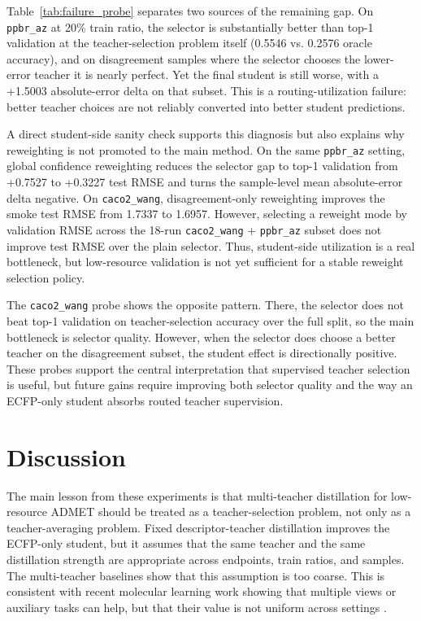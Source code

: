 \documentclass[11pt]{article}
\begin{document}
Table~\ref{tab:failure_probe} separates two sources of the remaining gap. On
\texttt{ppbr\_az} at 20\% train ratio, the selector is substantially better
than top-1 validation at the teacher-selection problem itself
(0.5546 vs. 0.2576 oracle accuracy), and on disagreement samples where the
selector chooses the lower-error teacher it is nearly perfect. Yet the final
student is still worse, with a +1.5003 absolute-error delta on that subset.
This is a routing-utilization failure: better teacher choices are not reliably
converted into better student predictions.

A direct student-side sanity check supports this diagnosis but also explains
why reweighting is not promoted to the main method. On the same
\texttt{ppbr\_az} setting, global confidence reweighting reduces the selector
gap to top-1 validation from +0.7527 to +0.3227 test RMSE and turns the
sample-level mean absolute-error delta negative. On \texttt{caco2\_wang},
disagreement-only reweighting improves the smoke test RMSE from 1.7337 to
1.6957. However, selecting a reweight mode by validation RMSE across the
18-run \texttt{caco2\_wang} + \texttt{ppbr\_az} subset does not improve test
RMSE over the plain selector. Thus, student-side utilization is a real
bottleneck, but low-resource validation is not yet sufficient for a stable
reweight selection policy.

The \texttt{caco2\_wang} probe shows the opposite pattern. There, the selector
does not beat top-1 validation on teacher-selection accuracy over the
full split, so the main bottleneck is selector quality. However, when the
selector does choose a better teacher on the disagreement subset, the student
effect is directionally positive. These probes support the central
interpretation that supervised teacher selection is useful, but future gains
require improving both selector quality and the way an ECFP-only student
absorbs routed teacher supervision.

\section{Discussion}

The main lesson from these experiments is that multi-teacher distillation for
low-resource ADMET should be treated as a teacher-selection problem, not only
as a teacher-averaging problem. Fixed descriptor-teacher distillation improves
the ECFP-only student, but it assumes that the same teacher and the same
distillation strength are appropriate across endpoints, train ratios, and
samples. The multi-teacher baselines show that this assumption is too coarse.
This is consistent with recent molecular learning work showing that multiple
views or auxiliary tasks can help, but that their value is not uniform across
settings \cite{Zheng2024MolFuse,Du2023MTGLADMET,Dey2024AuxAdapt}.
\end{document}
